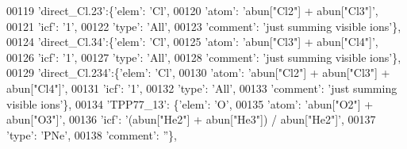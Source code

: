 \begin{DoxyCode}
00119                          \textcolor{stringliteral}{'direct\_Cl.23'}:\{\textcolor{stringliteral}{'elem'}: \textcolor{stringliteral}{'Cl'},
00120                                        \textcolor{stringliteral}{'atom'}: \textcolor{stringliteral}{'abun["Cl2"] + abun["Cl3"]'},
00121                                        \textcolor{stringliteral}{'icf'}: \textcolor{stringliteral}{'1'},
00122                                        \textcolor{stringliteral}{'type'}: \textcolor{stringliteral}{'All'},
00123                                        \textcolor{stringliteral}{'comment'}: \textcolor{stringliteral}{'just summing visible ions'}\},
00124                          \textcolor{stringliteral}{'direct\_Cl.34'}:\{\textcolor{stringliteral}{'elem'}: \textcolor{stringliteral}{'Cl'},
00125                                        \textcolor{stringliteral}{'atom'}: \textcolor{stringliteral}{'abun["Cl3"] + abun["Cl4"]'},
00126                                        \textcolor{stringliteral}{'icf'}: \textcolor{stringliteral}{'1'},
00127                                        \textcolor{stringliteral}{'type'}: \textcolor{stringliteral}{'All'},
00128                                        \textcolor{stringliteral}{'comment'}: \textcolor{stringliteral}{'just summing visible ions'}\},
00129                          \textcolor{stringliteral}{'direct\_Cl.234'}:\{\textcolor{stringliteral}{'elem'}: \textcolor{stringliteral}{'Cl'},
00130                                        \textcolor{stringliteral}{'atom'}: \textcolor{stringliteral}{'abun["Cl2"] + abun["Cl3"] + abun["Cl4"]'},
00131                                        \textcolor{stringliteral}{'icf'}: \textcolor{stringliteral}{'1'},
00132                                        \textcolor{stringliteral}{'type'}: \textcolor{stringliteral}{'All'},
00133                                        \textcolor{stringliteral}{'comment'}: \textcolor{stringliteral}{'just summing visible ions'}\},
00134                          \textcolor{stringliteral}{'TPP77\_13'}: \{\textcolor{stringliteral}{'elem'}: \textcolor{stringliteral}{'O'},
00135                                       \textcolor{stringliteral}{'atom'}: \textcolor{stringliteral}{'abun["O2"] + abun["O3"]'},
00136                                       \textcolor{stringliteral}{'icf'}: \textcolor{stringliteral}{'(abun["He2"] + abun["He3"]) / abun["He2"]'},
00137                                       \textcolor{stringliteral}{'type'}: \textcolor{stringliteral}{'PNe'},
00138                                       \textcolor{stringliteral}{'comment'}: \textcolor{stringliteral}{''}\},

\end{DoxyCode}

